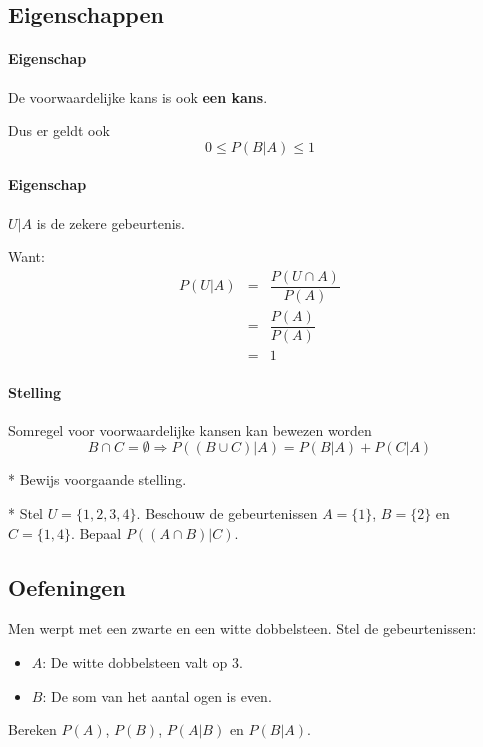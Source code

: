 \documentclass[12pt,twoside]{article}
\begin{document}
\subsection{Eigenschappen}

\paragraph*{Eigenschap} De voorwaardelijke kans is ook {\bf een kans}.

Dus er geldt ook
$$0\leq P(B|A)\leq 1$$

\paragraph*{Eigenschap} $U|A$ is de zekere gebeurtenis.

Want:
\begin{eqnarray*}
  P(U|A) &=& \dfrac{P(U\cap A)}{P(A)}\\
         &=& \dfrac{P(A)}{P(A)}\\
         &=& 1
\end{eqnarray*}

\paragraph*{Stelling} Somregel voor voorwaardelijke kansen kan bewezen worden
$$B\cap C=\emptyset \Rightarrow P((B\cup C)|A)=P(B|A)+P(C|A)$$

\begin{oefening}*
Bewijs voorgaande stelling.
\end{oefening}

\begin{oefening}*
Stel $U=\{1,2,3,4\}$. Beschouw de gebeurtenissen $A=\{1\}$, $B=\{2\}$ en $C=\{1,4\}$. Bepaal $P((A\cap B)|C)$.
\end{oefening}

\subsection{Oefeningen}

\begin{oefening}
Men werpt met een zwarte en een witte dobbelsteen. Stel de gebeurtenissen:
\begin{itemize}
  \item $A$: De witte dobbelsteen valt op 3.
	\item $B$: De som van het aantal ogen is even.
\end{itemize}
Bereken $P(A)$, $P(B)$, $P(A|B)$ en $P(B|A)$.
\end{oefening}
\end{document}
